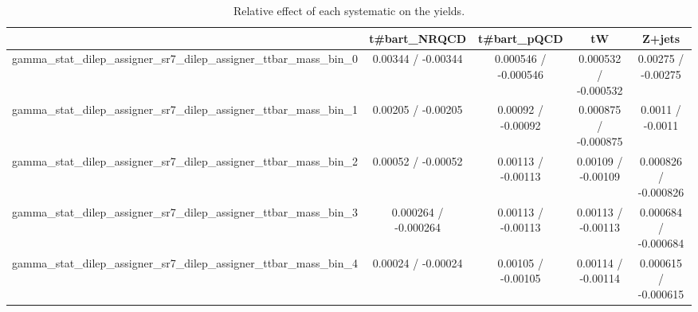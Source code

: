 \documentclass[10pt]{article}
\begin{document}
\begin{table}[htbp]
\begin{center}
\begin{tabular}{|c|c|c|c|c|}
\hline 
      & t#bar{t}_{NRQCD}      & t#bar{t}_{pQCD}      & tW      & Z+jets \\ 
\hline 
  gamma_stat_dilep_assigner_sr7_dilep_assigner_ttbar_mass_bin_0 & 0.00344 / -0.00344 & 0.000546 / -0.000546 & 0.000532 / -0.000532 & 0.00275 / -0.00275 \\ 
  gamma_stat_dilep_assigner_sr7_dilep_assigner_ttbar_mass_bin_1 & 0.00205 / -0.00205 & 0.00092 / -0.00092 & 0.000875 / -0.000875 & 0.0011 / -0.0011 \\ 
  gamma_stat_dilep_assigner_sr7_dilep_assigner_ttbar_mass_bin_2 & 0.00052 / -0.00052 & 0.00113 / -0.00113 & 0.00109 / -0.00109 & 0.000826 / -0.000826 \\ 
  gamma_stat_dilep_assigner_sr7_dilep_assigner_ttbar_mass_bin_3 & 0.000264 / -0.000264 & 0.00113 / -0.00113 & 0.00113 / -0.00113 & 0.000684 / -0.000684 \\ 
  gamma_stat_dilep_assigner_sr7_dilep_assigner_ttbar_mass_bin_4 & 0.00024 / -0.00024 & 0.00105 / -0.00105 & 0.00114 / -0.00114 & 0.000615 / -0.000615 \\ 
\hline 
\end{tabular} 
\caption{Relative effect of each systematic on the yields.} 
\end{center} 
\end{table} 
\end{document}
